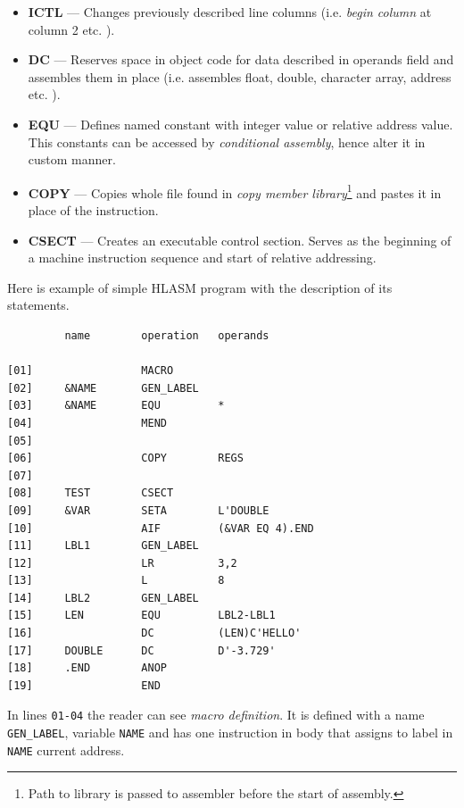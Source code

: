 \begin{itemize}
	\item \textbf{ICTL} --- Changes previously described line columns (i.e. \textit{begin column} at column 2 etc. ).
	
	\item \textbf{DC} --- Reserves space in object code for data described in operands field and assembles them in place (i.e. assembles float, double, character array, address etc. ).
	
	\item \textbf{EQU} --- Defines named constant with integer value or relative address value. This constants can be accessed by \textit{conditional assembly}, hence alter it in custom manner.
	
	\item \textbf{COPY} --- Copies whole file found in \textit{copy member library}\footnote{Path to library is passed to assembler before the start of assembly.} and pastes it in place of the instruction.
	
	\item \textbf{CSECT} --- Creates an executable control section. Serves as the beginning of a machine instruction sequence and start of relative addressing.
\end{itemize}

Here is example of simple HLASM program with the description of its statements.

\begin{verbatim}
         name        operation   operands
         
[01]                 MACRO                   
[02]     &NAME       GEN_LABEL
[03]     &NAME       EQU         *
[04]                 MEND
[05]             
[06]                 COPY        REGS
[07]             
[08]     TEST        CSECT
[09]     &VAR        SETA        L'DOUBLE
[10]                 AIF         (&VAR EQ 4).END
[11]     LBL1        GEN_LABEL
[12]                 LR          3,2
[13]                 L           8
[14]     LBL2        GEN_LABEL
[15]     LEN         EQU         LBL2-LBL1
[16]                 DC          (LEN)C'HELLO'
[17]     DOUBLE      DC          D'-3.729'
[18]     .END        ANOP
[19]                 END
\end{verbatim} 

In lines \verb|01-04| the reader can see \textit{macro definition}. It is defined with a name \verb|GEN_LABEL|, variable \verb|NAME| and has one instruction in body that assigns to label in \verb|NAME| current address.

